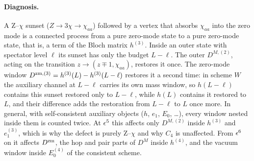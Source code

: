 \paragraph{Diagnosis.} A Z--$\chi$ sunset ($Z\to3\chi\to\chi_{aa}$) followed by a vertex that absorbs $\chi_{aa}$ into the zero
mode is a connected process from a pure zero-mode state to a pure zero-mode state, that is, a term of the Bloch matrix
$h^{(3)}$. Inside an outer state with spectator level $\ell$ its sunset has only the budget $L-\ell$. The outer $D^{M,(2)}$,
acting on the transition $z\to(z\mp1,\chi_{aa})$, restores it once. The zero-mode window $D^{{\rm zm},(3)}=h^{(3)}(L)-h^{(3)}(L-\ell)$
restores it a second time: in scheme $W$ the auxiliary channel at $L-\ell$ carries its own mass window, so $h(L-\ell)$
contains this sunset restored only to $L-\ell$, while $h(L)$ contains it restored to $L$, and their difference adds the
restoration from $L-\ell$ to $L$ once more. In general, with self-consistent
auxiliary objects ($h$, $e_1$, $E_0$, \dots), every window nested inside them is counted twice. At $\epsilon^5$ this affects only
$D^{M,(2)}$ inside $h^{(3)}$ and $e_1^{(3)}$, which is why the defect is purely Z--$\chi$ and why $C_4$ is unaffected. From
$\epsilon^6$ on it affects $D^{\rm zm}$, the hop and pair parts of $D^M$ inside $h^{(4)}$, and the vacuum window inside
$E_0^{(4)}$ of the consistent scheme.

